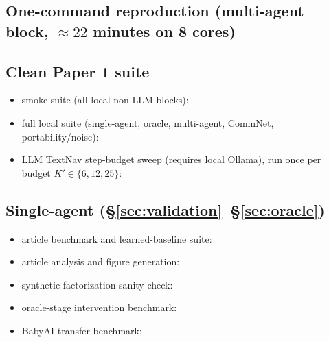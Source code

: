 \documentclass{article}
\begin{document}
\subsection*{One-command reproduction (multi-agent block, $\approx 22$ minutes on 8 cores)}

\subsection*{Clean Paper 1 suite}
\begin{itemize}[leftmargin=16pt]
\item smoke suite (all local non-LLM blocks): 
\item full local suite (single-agent, oracle, multi-agent, CommNet, portability/noise): 
\item LLM TextNav step-budget sweep (requires local Ollama), run once per budget $K'\in\{6,12,25\}$: 
\end{itemize}

\subsection*{Single-agent (\S\ref{sec:validation}--\S\ref{sec:oracle})}
\begin{itemize}[leftmargin=16pt]
\item article benchmark and learned-baseline suite: 
\item article analysis and figure generation: 
\item synthetic factorization sanity check: 
\item oracle-stage intervention benchmark: 
\item BabyAI transfer benchmark: 
\end{itemize}
\end{document}
